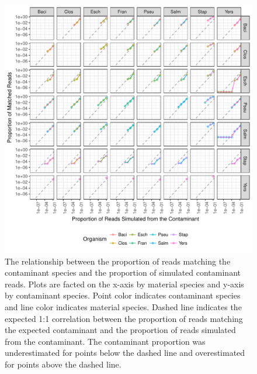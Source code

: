 \documentclass[fleqn,10pt,lineno]{wlpeerj}\usepackage[]{graphicx}\usepackage[]{color}
\makeatletter
\def\maxwidth{ %
  \ifdim\Gin@nat@width>\linewidth
    \linewidth
  \else
    \Gin@nat@width
  \fi
}
\newenvironment{knitrout}{}{} %
\makeatother
\begin{document}
\begin{knitrout}
\color{fgcolor}\begin{figure}
\includegraphics[width=\maxwidth]{figure/contam_fig-1} \caption[The relationship between the proportion of reads matching the contaminant species and the proportion of simulated contaminant reads]{The relationship between the proportion of reads matching the contaminant species and the proportion of simulated contaminant reads. Plots are facted on the x-axis by material species and y-axis by contaminant species. Point color indicates contaminant species and line color indicates material species. Dashed line indicates the expected 1:1 correlation between the proportion of reads matching the expected contaminant and the proportion of reads simulated from the contaminant. The contaminant proportion was underestimated for points below the dashed line and overestimated for points above the dashed line.}\label{fig:contam_fig}
\end{figure}


\end{knitrout}
\end{document}
